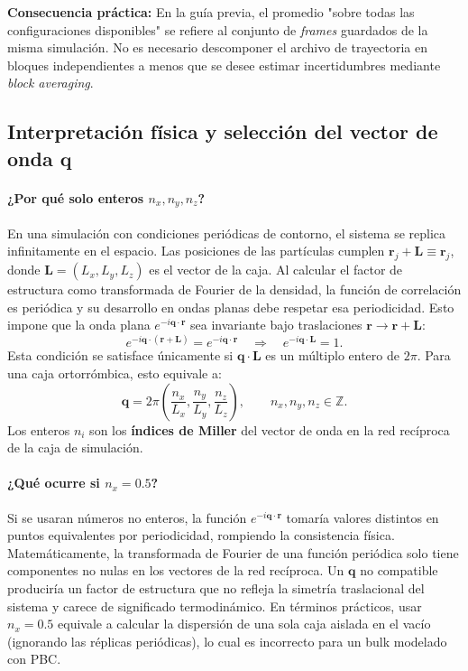 \documentclass{tufte-handout}
\begin{document}
\textbf{Consecuencia práctica:} En la guía previa, el promedio "sobre todas las configuraciones disponibles" se refiere al conjunto de \textit{frames} guardados de la misma simulación. No es necesario descomponer el archivo de trayectoria en bloques independientes a menos que se desee estimar incertidumbres mediante \textit{block averaging}.

\newpage

\subsection{Interpretación física y selección del vector de onda $\mathbf{q}$}

\paragraph*{¿Por qué solo enteros $n_x, n_y, n_z$?}

En una simulación con condiciones periódicas de contorno, el sistema se replica infinitamente en el espacio. Las posiciones de las partículas cumplen $\mathbf{r}_j + \mathbf{L} \equiv \mathbf{r}_j$, donde $\mathbf{L} = (L_x, L_y, L_z)$ es el vector de la caja. Al calcular el factor de estructura como transformada de Fourier de la densidad, la función de correlación es periódica y su desarrollo en ondas planas debe respetar esa periodicidad. Esto impone que la onda plana $e^{-i\mathbf{q}\cdot\mathbf{r}}$ sea invariante bajo traslaciones $\mathbf{r} \to \mathbf{r} + \mathbf{L}$:
\begin{equation}
e^{-i\mathbf{q}\cdot(\mathbf{r}+\mathbf{L})} = e^{-i\mathbf{q}\cdot\mathbf{r}} \quad \Rightarrow \quad e^{-i\mathbf{q}\cdot\mathbf{L}} = 1.
\end{equation}
Esta condición se satisface únicamente si $\mathbf{q}\cdot\mathbf{L}$ es un múltiplo entero de $2\pi$. Para una caja ortorrómbica, esto equivale a:
\begin{equation}
\mathbf{q} = 2\pi\left( \frac{n_x}{L_x}, \frac{n_y}{L_y}, \frac{n_z}{L_z} \right), \qquad n_x, n_y, n_z \in \mathbb{Z}.
\end{equation}
Los enteros $n_i$ son los \textbf{índices de Miller} del vector de onda en la red recíproca de la caja de simulación.

\paragraph*{¿Qué ocurre si $n_x = 0.5$?}

Si se usaran números no enteros, la función $e^{-i\mathbf{q}\cdot\mathbf{r}}$ tomaría valores distintos en puntos equivalentes por periodicidad, rompiendo la consistencia física. Matemáticamente, la transformada de Fourier de una función periódica solo tiene componentes no nulas en los vectores de la red recíproca. Un $\mathbf{q}$ no compatible produciría un factor de estructura que no refleja la simetría traslacional del sistema y carece de significado termodinámico. En términos prácticos, usar $n_x = 0.5$ equivale a calcular la dispersión de una sola caja aislada en el vacío (ignorando las réplicas periódicas), lo cual es incorrecto para un bulk modelado con PBC.
\end{document}
